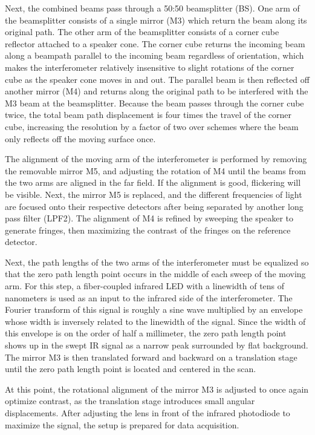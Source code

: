 \documentclass[12pt]{puthesis}
\begin{document}
Next, the combined beams pass through a 50:50 beamsplitter (BS). One arm of the beamsplitter consists of a single mirror (M3) which return the beam along its original path. The other arm of the beamsplitter consists of a corner cube reflector attached to a speaker cone. The corner cube returns the incoming beam along a beampath parallel to the incoming beam regardless of orientation, which makes the interferometer relatively insensitive to slight rotations of the corner cube as the speaker cone moves in and out. The parallel beam is then reflected off another mirror (M4) and returns along the original path to be interfered with the M3 beam at the beamsplitter. Because the beam passes through the corner cube twice, the total beam path displacement is four times the travel of the corner cube, increasing the resolution by a factor of two over schemes where the beam only reflects off the moving surface once.

The alignment of the moving arm of the interferometer is performed by removing the removable mirror M5, and adjusting the rotation of M4 until the beams from the two arms are aligned in the far field. If the alignment is good, flickering will be visible. Next, the mirror M5 is replaced, and the different frequencies of light are focused onto their respective detectors after being separated by another long pass filter (LPF2). The alignment of M4 is refined by sweeping the speaker to generate fringes, then maximizing the contrast of the fringes on the reference detector.

Next, the path lengths of the two arms of the interferometer must be equalized so that the zero path length point occurs in the middle of each sweep of the moving arm. For this step, a fiber-coupled infrared LED with a linewidth of tens of nanometers is used as an input to the infrared side of the interferometer. The Fourier transform of this signal is roughly a sine wave multiplied by an envelope whose width is inversely related to the linewidth of the signal. Since the width of this envelope is on the order of half a millimeter, the zero path length point shows up in the swept IR signal as a narrow peak surrounded by flat background. The mirror M3 is then translated forward and backward on a translation stage until the zero path length point is located and centered in the scan.

At this point, the rotational alignment of the mirror M3 is adjusted to once again optimize contrast, as the translation stage introduces small angular displacements. After adjusting the lens in front of the infrared photodiode to maximize the signal, the setup is prepared for data acquisition.
\end{document}
